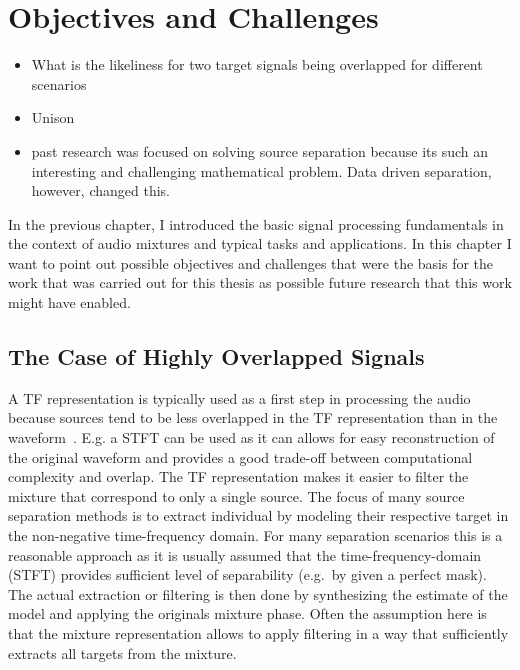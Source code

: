 \hypertarget{objectives-and-challenges}{%
\chapter{Objectives and Challenges}\label{objectives-and-challenges}}

\begin{itemize}
  \item What is the likeliness for two target signals being overlapped for different scenarios
  \item Unison
  \item past research was focused on solving source separation because its such an interesting and challenging mathematical problem. Data driven separation, however, changed this.
\end{itemize}

In the previous chapter, I introduced the basic signal processing fundamentals in the context of audio mixtures and typical tasks and applications.
In this chapter I want to point out possible objectives and challenges that were the basis for the work that was carried out for this thesis as possible future research that this work might have enabled.

\hypertarget{highly-overlapped-signals}{%
\section{The Case of Highly Overlapped Signals}\label{highly-overlapped-signals}}

A TF representation is typically used as a first step in processing the audio because sources tend to be less overlapped in the TF representation than in the waveform~\cite{rickard02, giannoulis11}.
E.g. a STFT can be used as it can allows for easy reconstruction of the original waveform and provides a good trade-off between computational complexity and overlap.
The TF representation makes it easier to filter the mixture that correspond to only a single source.
The focus of many source separation methods is to extract individual by modeling their respective target in the non-negative
time-frequency domain.
For many separation scenarios this is a reasonable approach as it is usually assumed that the time-frequency-domain (STFT) provides sufficient level of separability (e.g.~by given a perfect mask).
The actual extraction or filtering is then done by synthesizing the estimate of the model and applying the originals mixture phase.
Often the assumption here is that the mixture representation allows to apply filtering in a way that sufficiently extracts all targets from the mixture.
\\

